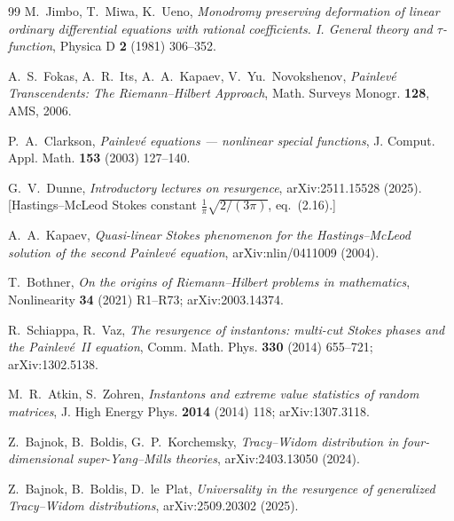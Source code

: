 \documentclass[11pt,reqno]{amsart}
\theoremstyle{plain}
\theoremstyle{definition}
\theoremstyle{remark}
\begin{document}
\begin{thebibliography}{99}
 M.~Jimbo, T.~Miwa, K.~Ueno, \emph{Monodromy preserving deformation of linear
ordinary differential equations with rational coefficients. I. General theory and $\tau$-function},
Physica D \textbf{2} (1981) 306--352.

 A.~S.~Fokas, A.~R.~Its, A.~A.~Kapaev, V.~Yu.~Novokshenov, \emph{Painlev\'e
Transcendents: The Riemann--Hilbert Approach}, Math. Surveys Monogr. \textbf{128}, AMS, 2006.

 P.~A.~Clarkson, \emph{Painlev\'e equations --- nonlinear special functions},
J. Comput. Appl. Math. \textbf{153} (2003) 127--140.

 G.~V.~Dunne, \emph{Introductory lectures on resurgence}, arXiv:2511.15528
(2025). [Hastings--McLeod Stokes constant $\tfrac1\pi\sqrt{2/(3\pi)}$, eq.~(2.16).]

 A.~A.~Kapaev, \emph{Quasi-linear Stokes phenomenon for the Hastings--McLeod
solution of the second Painlev\'e equation}, arXiv:nlin/0411009 (2004).

 T.~Bothner, \emph{On the origins of Riemann--Hilbert problems in mathematics},
Nonlinearity \textbf{34} (2021) R1--R73; arXiv:2003.14374.

 R.~Schiappa, R.~Vaz, \emph{The resurgence of instantons: multi-cut Stokes
phases and the Painlev\'e~II equation}, Comm. Math. Phys. \textbf{330} (2014) 655--721;
arXiv:1302.5138.

 M.~R.~Atkin, S.~Zohren, \emph{Instantons and extreme value statistics of
random matrices}, J. High Energy Phys. \textbf{2014} (2014) 118; arXiv:1307.3118.

 Z.~Bajnok, B.~Boldis, G.~P.~Korchemsky, \emph{Tracy--Widom distribution in
four-dimensional super-Yang--Mills theories}, arXiv:2403.13050 (2024).

 Z.~Bajnok, B.~Boldis, D.~le~Plat, \emph{Universality in the resurgence of
generalized Tracy--Widom distributions}, arXiv:2509.20302 (2025).

\end{thebibliography}
\end{document}
